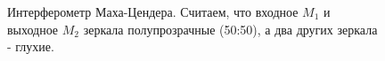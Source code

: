\begin{figure}
\centering



\caption{Интерферометр Маха-Цендера. Считаем, что входное $M_1$ и
  выходное $M_2$ зеркала полупрозрачные (50:50), а два других зеркала
  - глухие.} 
\label{figPart2Interfero_4}
\end{figure}
